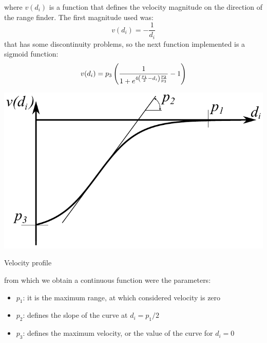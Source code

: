 where ${v(d_i)}$ is a function that defines the velocity magnitude on the direction of the range finder. The first magnitude used was:
\begin{equation}
v(d_i) = - \dfrac{1}{d_i}
\end{equation}
that has some discontinuity problems, so the next function implemented is a sigmoid function:
\begin{equation}
v(d_i) = p_3 \left( \dfrac{1}{1+e^{4 \left( \frac{p_1}{2}-d_i \right)\frac{p_2}{p_3}}}-1 \right)
\end{equation}
\begin{marginfigure}
	\centering
	\includegraphics[scale=0.4]{ch3/img/speed_profile.pdf}
	\caption{Velocity profile}
\end{marginfigure}
from which we obtain a continuous function were the parameters:
\begin{itemize}
\item $p_1$: it is the maximum range, at which considered velocity is zero
\item $p_2$: defines the slope of the curve at ${d_i = p_1/2}$
\item $p_3$: defines the maximum velocity, or the value of the curve for ${d_i = 0}$
\end{itemize}

